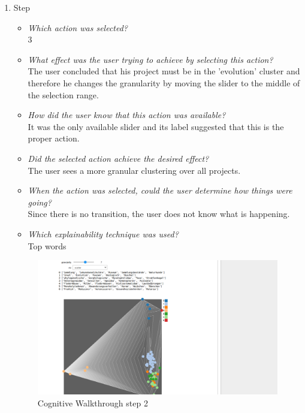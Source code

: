{\begin{enumerate}
		\item Step
		\begin{itemize}
			\item \textit{Which action was selected?} \\
			3
			\item \textit{What effect was the user trying to achieve by selecting this action?} \\
			The user concluded that his project must be in the 'evolution' cluster and therefore he changes the granularity by moving the slider to the middle of the selection range. 
			\item \textit{How did the user know that this action was available?} \\
			It was the only available slider and its label suggested that this is the proper action. 
			\item \textit{Did the selected action achieve the desired effect?} \\
			The user sees a more granular clustering over all projects. 
			\item \textit{When the action was selected, could the user determine how things were going?} \\
			Since there is no transition, the user does not know what is happening.
			\item \textit{Which explainability technique was used?}\\
			Top words
		\end{itemize}
		\begin{figure}[H]
			\centering
			\includegraphics[width=400px]{../chapters/validation/pics/2_c}
			\caption{\label{pic:step2} Cognitive Walkthrough step 2}
		\end{figure} \newpage
		

\end{enumerate}}
